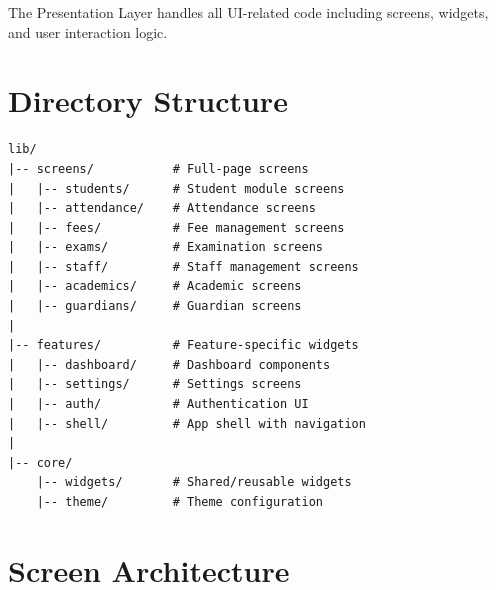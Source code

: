 \documentclass[12pt,a4paper]{report}
\begin{document}
The Presentation Layer handles all UI-related code including screens, widgets, and user interaction logic.

\section{Directory Structure}

\begin{lstlisting}
lib/
|-- screens/           # Full-page screens
|   |-- students/      # Student module screens
|   |-- attendance/    # Attendance screens
|   |-- fees/          # Fee management screens
|   |-- exams/         # Examination screens
|   |-- staff/         # Staff management screens
|   |-- academics/     # Academic screens
|   |-- guardians/     # Guardian screens
|
|-- features/          # Feature-specific widgets
|   |-- dashboard/     # Dashboard components
|   |-- settings/      # Settings screens
|   |-- auth/          # Authentication UI
|   |-- shell/         # App shell with navigation
|
|-- core/
    |-- widgets/       # Shared/reusable widgets
    |-- theme/         # Theme configuration
\end{lstlisting}

\section{Screen Architecture}

\begin{center}
\end{center}
\end{document}
